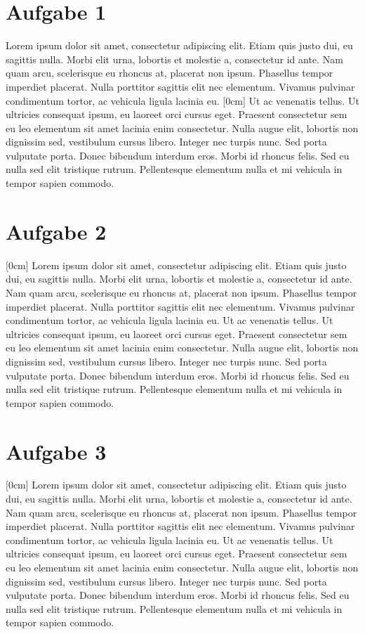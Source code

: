 \documentclass[a4paper]{scrartcl}
\begin{document}
\section*{Aufgabe 1}
Lorem ipsum dolor sit amet, consectetur adipiscing elit. Etiam quis justo dui, eu sagittis nulla. Morbi elit urna, lobortis et molestie a, consectetur id ante. Nam quam arcu, scelerisque eu rhoncus at, placerat non ipsum. Phasellus tempor imperdiet placerat. Nulla porttitor sagittis elit nec elementum. Vivamus pulvinar condimentum tortor, ac vehicula ligula lacinia eu.
[0cm]
Ut ac venenatis tellus. Ut ultricies consequat ipsum, eu laoreet orci cursus eget. Praesent consectetur sem eu leo elementum sit amet lacinia enim consectetur. Nulla augue elit, lobortis non dignissim sed, vestibulum cursus libero. Integer nec turpis nunc. Sed porta vulputate porta. Donec bibendum interdum eros. Morbi id rhoncus felis. Sed eu nulla sed elit tristique rutrum. Pellentesque elementum nulla et mi vehicula in tempor sapien commodo.



\section*{Aufgabe 2}
[0cm]
Lorem ipsum dolor sit amet, consectetur adipiscing elit. Etiam quis justo dui, eu sagittis nulla. Morbi elit urna, lobortis et molestie a, consectetur id ante. Nam quam arcu, scelerisque eu rhoncus at, placerat non ipsum. Phasellus tempor imperdiet placerat. Nulla porttitor sagittis elit nec elementum. Vivamus pulvinar condimentum tortor, ac vehicula ligula lacinia eu. Ut ac venenatis tellus. Ut ultricies consequat ipsum, eu laoreet orci cursus eget. Praesent consectetur sem eu leo elementum sit amet lacinia enim consectetur. Nulla augue elit, lobortis non dignissim sed, vestibulum cursus libero. Integer nec turpis nunc. Sed porta vulputate porta. Donec bibendum interdum eros. Morbi id rhoncus felis. Sed eu nulla sed elit tristique rutrum. Pellentesque elementum nulla et mi vehicula in tempor sapien commodo.

\section*{Aufgabe 3}
[0cm]
Lorem ipsum dolor sit amet, consectetur adipiscing elit. Etiam quis justo dui, eu sagittis nulla. Morbi elit urna, lobortis et molestie a, consectetur id ante. Nam quam arcu, scelerisque eu rhoncus at, placerat non ipsum. Phasellus tempor imperdiet placerat. Nulla porttitor sagittis elit nec elementum. Vivamus pulvinar condimentum tortor, ac vehicula ligula lacinia eu. Ut ac venenatis tellus. Ut ultricies consequat ipsum, eu laoreet orci cursus eget. Praesent consectetur sem eu leo elementum sit amet lacinia enim consectetur. Nulla augue elit, lobortis non dignissim sed, vestibulum cursus libero. Integer nec turpis nunc. Sed porta vulputate porta. Donec bibendum interdum eros. Morbi id rhoncus felis. Sed eu nulla sed elit tristique rutrum. Pellentesque elementum nulla et mi vehicula in tempor sapien commodo.
\end{document}
